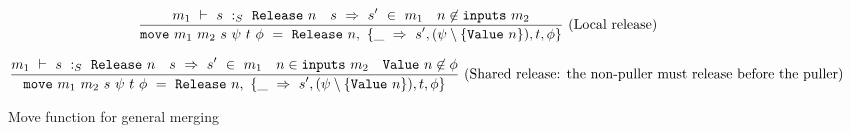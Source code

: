\begin{figure*}
$$
\frac {\displaystyle 
        m_1 ~\vdash~ s ~:_S~ \mathtt{Release}~n
        \quad
        s ~\Rightarrow~ s' ~\in~m_1
        \quad
        n \not\in \mathtt{inputs}~m_2
} {\displaystyle 
    \mathtt{move}~m_1~m_2~s~\psi~t~\phi~=~\mathtt{Release}~n,~\{ 
          \_~\Rightarrow~s', (\psi \setminus \{\mathtt{Value}~n\}), t, \phi 
         \}
} \ 
\textrm{(Local release)}
$$

$$
\frac {\displaystyle 
        m_1 ~\vdash~ s ~:_S~ \mathtt{Release}~n
        \quad
        s ~\Rightarrow~ s' ~\in~m_1
        \quad
        n \in \mathtt{inputs}~m_2
        \quad
        \mathtt{Value}~n \not\in \phi
} {\displaystyle 
    \mathtt{move}~m_1~m_2~s~\psi~t~\phi~=~\mathtt{Release}~n,~\{ 
          \_~\Rightarrow~s', (\psi \setminus \{\mathtt{Value}~n\}), t, \phi 
         \}
} \ 
\textrm{(Shared release: the non-puller must release before the puller)}
$$





\caption{Move function for general merging}
\label{fig:merge:general}
\end{figure*}

